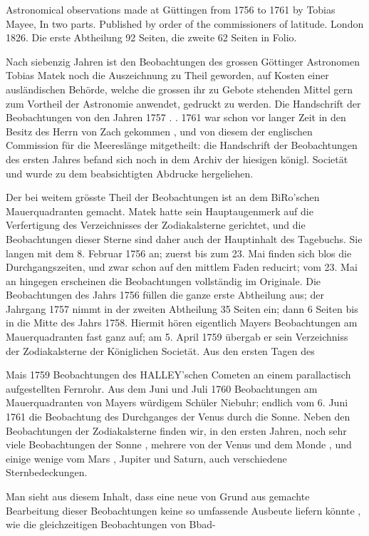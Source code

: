 \documentclass[10pt,a4paper]{article}
\begin{document}
Astronomical observations made at Güttingen from 1756 to 1761 by Tobias Mayee, In two parts. Published by order of the commissioners of latitude. London 1826. Die erste Abtheilung 92 Seiten, die zweite 62 Seiten in Folio.

Nach siebenzig Jahren ist den Beobachtungen des grossen Göttinger Astronomen Tobias Matek noch die Auszeichnung zu Theil geworden, auf Kosten einer ausländischen Behörde, welche die grossen ihr zu Gebote stehenden Mittel gern zum Vortheil der Astronomie anwendet, gedruckt zu werden. Die Handschrift der Beobachtungen von den Jahren 1757 . . 1761 war schon vor langer Zeit in den Besitz des Herrn von Zach gekommen , und von diesem der englischen Commission für die Meereslänge mitgetheilt: die Handschrift der Beobachtungen des ersten Jahres befand sich noch in dem Archiv der hiesigen königl. Societät und wurde zu dem beabsichtigten Abdrucke hergeliehen.

Der bei weitem grösste Theil der Beobachtungen ist an dem BiRo'schen Mauerquadranten gemacht. Matek hatte sein Hauptaugenmerk auf die Verfertigung des Verzeichnisses der Zodiakalsterne gerichtet, und die Beobachtungen dieser Sterne sind daher auch der Hauptinhalt des Tagebuchs. Sie langen mit dem 8. Februar 1756 an; zuerst bis zum 23. Mai finden sich blos die Durchgangszeiten, und zwar schon auf den mittlem Faden reducirt; vom 23. Mai an hingegen erscheinen die Beobachtungen vollständig im Originale. Die Beobachtungen des Jahrs 1756 füllen die ganze erste Abtheilung aus; der Jahrgang 1757 nimmt in der zweiten Abtheilung 35 Seiten ein; dann 6 Seiten bis in die Mitte des Jahrs 1758. Hiermit hören eigentlich Mayers Beobachtungen am Mauerquadranten fast ganz auf; am 5. April 1759 übergab er sein Verzeichniss der Zodiakalsterne der Königlichen Societät. Aus den ersten Tagen des

Mais 1759 Beobachtungen des HALLEY'schen Cometen an einem parallactisch aufgestellten Fernrohr. Aus dem Juni und Juli 1760 Beobachtungen am Mauerquadranten von Mayers würdigem Schüler Niebuhr; endlich vom 6. Juni 1761 die Beobachtung des Durchganges der Venus durch die Sonne. Neben den Beobachtungen der Zodiakalsterne finden wir, in den ersten Jahren, noch sehr viele Beobachtungen der Sonne , mehrere von der Venus und dem Monde , und einige wenige vom Mars , Jupiter und Saturn, auch verschiedene Sternbedeckungen.

Man sieht aus diesem Inhalt, dass eine neue von Grund aus gemachte Bearbeitung dieser Beobachtungen keine so umfassende Ausbeute liefern könnte , wie die gleichzeitigen Beobachtungen von Bbad-
\end{document}
